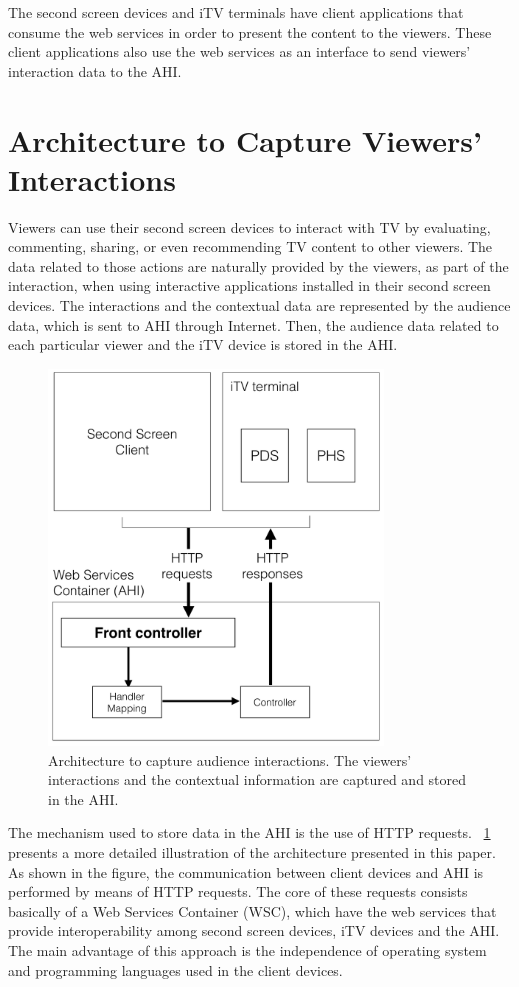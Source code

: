 \documentclass[journal]{IEEEtran}
\begin{document}
The second screen devices and iTV terminals have client applications that consume the web services in order to present the content to the viewers. These client applications also use the web services as an interface to send viewers' interaction data to the AHI. 

\section{Architecture to Capture Viewers' Interactions}
\label{sec_architecture}

Viewers can use their second screen devices to interact with TV by evaluating, commenting, sharing, or even recommending TV content to other viewers. The data related to those actions are naturally provided by the viewers, as part of the interaction, when using interactive applications installed in their second screen devices. The interactions and the contextual data are represented by the audience data, which is sent to AHI through Internet. Then, the audience data related to each particular viewer and the iTV device is stored in the AHI.

\begin{figure}[!t]
	\centering
	\includegraphics[width=3.5in]{img/architecture-detailed.pdf}
	\caption{Architecture to capture audience interactions. The viewers' interactions and the contextual information are captured and stored in the AHI.}
	\label{fig_arch_detail}
\end{figure}

The mechanism used to store data in the AHI is the use of HTTP requests. \figurename{~\ref{fig_arch_detail}} presents a more detailed illustration of the architecture presented in this paper. As shown in the figure, the communication between client devices and AHI is performed by means of HTTP requests. The core of these requests consists basically of a Web Services Container (WSC), which have the web services that provide interoperability among second screen devices, iTV devices and the AHI. The main advantage of this approach is the independence of operating system and programming languages used in the client devices.
 
\end{document}
